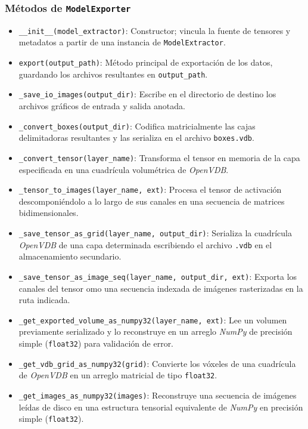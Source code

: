 \subsubsection*{Métodos de \texttt{ModelExporter}}
\begin{itemize}
    \item \texttt{\_\_init\_\_(model\_extractor)}: Constructor; vincula la fuente de tensores y metadatos 
    a partir de una instancia de \texttt{ModelExtractor}.
    \item \texttt{export(output\_path)}: Método principal de exportación de los datos, guardando los 
    archivos resultantes en \texttt{output\_path}.
    \item \texttt{\_save\_io\_images(output\_dir)}: Escribe en el directorio de destino los archivos 
    gráficos de entrada y salida anotada.
    \item \texttt{\_convert\_boxes(output\_dir)}: Codifica matricialmente las cajas delimitadoras resultantes 
    y las serializa en el archivo \texttt{boxes.vdb}.
    \item \texttt{\_convert\_tensor(layer\_name)}: Transforma el tensor en memoria de la capa especificada en 
    una cuadrícula volumétrica de \textit{OpenVDB}.
    \item \texttt{\_tensor\_to\_images(layer\_name, ext)}: Procesa el tensor de activación descomponiéndolo a 
    lo largo de sus canales en una secuencia de matrices bidimensionales.
    \item \texttt{\_save\_tensor\_as\_grid(layer\_name, output\_dir)}: Serializa la cuadrícula \textit{OpenVDB} 
    de una capa determinada escribiendo el archivo \texttt{.vdb} en el almacenamiento secundario.
    \item \texttt{\_save\_tensor\_as\_image\_seq(layer\_name, output\_dir, ext)}: Exporta los canales del tensor 
    omo una secuencia indexada de imágenes rasterizadas en la ruta indicada.
    \item \texttt{\_get\_exported\_volume\_as\_numpy32(layer\_name, ext)}: Lee un volumen previamente serializado 
    y lo reconstruye en un arreglo \textit{NumPy} de precisión simple (\texttt{float32}) para validación de error.
    \item \texttt{\_get\_vdb\_grid\_as\_numpy32(grid)}: Convierte los vóxeles de una cuadrícula de \textit{OpenVDB} 
    en un arreglo matricial de tipo \texttt{float32}.
    \item \texttt{\_get\_images\_as\_numpy32(images)}: Reconstruye una secuencia de imágenes leídas de disco en una 
    estructura tensorial equivalente de \textit{NumPy} en precisión simple (\texttt{float32}).
\end{itemize}

